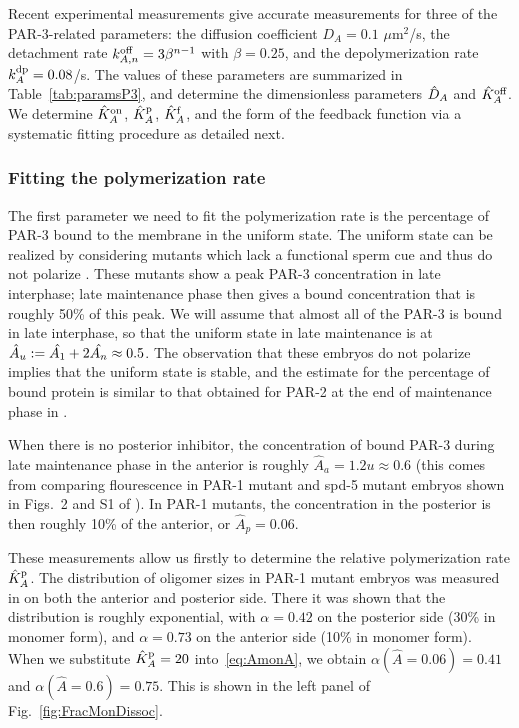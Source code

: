 \documentclass[11pt]{article}
\newcommand{\6}[1]{#1_{\text{6}}}
\newcommand{\3}[1]{#1_{\text{3}}}
\begin{document}
Recent experimental measurements \cite{lang2023oligomerization} give accurate measurements for three of the PAR-3-related parameters: the diffusion coefficient $D_A=0.1$ $\mu$m$^2$/s, the detachment rate $k^\text{off}_{A,n}=3\beta^{n-1}$ with $\beta=0.25$, and the depolymerization rate $k^\text{dp}_A=0.08$/s. The values of these parameters are summarized in Table\ \ref{tab:paramsP3}, and determine the dimensionless parameters $\hat{D}_A$ and $\hat{K}^\text{off}_A$. We determine $\hat{K}^\text{on}_A$, $\hat{K}^\text{p}_A$, $\hat{K}^\text{f}_A$, and the form of the feedback function via a systematic fitting procedure as detailed next.

\subsubsection{Fitting the polymerization rate}
The first parameter we need to fit the polymerization rate is the percentage of PAR-3 bound to the membrane in the uniform state. The uniform state can be realized by considering mutants which lack a functional sperm cue and thus do not polarize \cite[Fig.~S1]{lang2023oligomerization}. These mutants show a peak PAR-3 concentration in late interphase; late maintenance phase then gives a bound concentration that is roughly 50\% of this peak. We will assume that almost all of the PAR-3 is bound in late interphase, so that the uniform state in late maintenance is at $\hat A_u:=\hat{A_1}+2\hat{A_n} \approx 0.5$. The observation that these embryos do not polarize implies that the uniform state is stable, and the estimate for the percentage of bound protein is similar to that obtained for PAR-2 at the end of maintenance phase in \cite[Fig.~S3]{gross2019guiding}. 

When there is no posterior inhibitor, the concentration of bound PAR-3 during late maintenance phase in the anterior is roughly $\hat A_a=1.2u \approx 0.6$ (this comes from comparing flourescence in PAR-1 mutant and spd-5 mutant embryos shown in Figs.\ 2 and S1 of \cite{lang2023oligomerization}). In PAR-1 mutants, the concentration in the posterior is then roughly 10\% of the anterior, or $\hat A_p=0.06$. 

These measurements allow us firstly to determine the relative polymerization rate $\hat{K}^\text{p}_A$. The distribution of oligomer sizes in PAR-1 mutant embryos was measured in \cite{lang2023oligomerization} on both the anterior and posterior side. There it was shown that the distribution is roughly exponential, with $\alpha=0.42$ on the posterior side (30\% in monomer form), and $\alpha=0.73$ on the anterior side (10\% in monomer form). When we substitute $\hat{K}^\text{p}_A=20$ into\ \eqref{eq:AmonA}, we obtain $\alpha(\hat A = 0.06)=0.41$ and $\alpha(\hat A = 0.6)=0.75$. This is shown in the left panel of Fig.\ \ref{fig:FracMonDissoc}.
\end{document}
